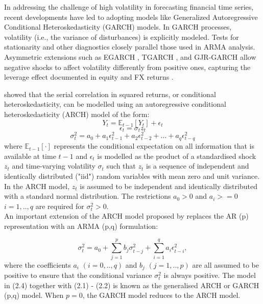 \documentclass[risks,article,submit,pdftex,moreauthors]{Definitions/mdpi}
\newcommand{\E}{\mathbb{E}}
\begin{document}
In addressing the challenge of high volatility in forecasting financial time series, recent developments have led to adopting models like Generalized Autoregressive Conditional Heteroskedasticity (GARCH) models. In GARCH processes, volatility (i.e., the variance of disturbances) is explicitly modeled. Tests for stationarity and other diagnostics closely parallel those used in ARMA analysis. Asymmetric extensions such as EGARCH \citep{nelson1991conditional}, TGARCH \citep{zakoian1994threshold}, and GJR-GARCH \citep{glosten1993relation} allow negative shocks to affect volatility differently from positive ones, capturing the leverage effect documented in equity and FX returns \citep{black1976studies, christie1982stochastic, cont2001empirical}.

\cite{engle1982autoregressive} showed that the serial correlation in squared returns, or conditional heteroskedasticity, can be modelled using an autoregressive conditional heteroskedasticity (ARCH) model of the form:
\begin{equation}
Y_t = \E_{t-1}[Y_t] + \epsilon_t
\end{equation}
\begin{equation}
\epsilon_t = \sigma_t z_t
\end{equation}
\begin{equation}
\sigma_t^2 = a_0 + a_1 \epsilon_{t-1}^2 + a_2 \epsilon_{t-2}^2 + \dots + a_q \epsilon_{t-q}^2  
\end{equation}
where \(\E_{t-1}[\cdot]\) represents the conditional expectation on all information that is available at time \(t-1\) and \(\epsilon_t\) is modelled as the product of a standardised shock \(z_t\) and time-varying volatility \(\sigma_t\) such that \(z_t\) is a sequence of independent and identically distributed ("iid") random variables with mean zero and unit variance. In the ARCH model, \(z_t\) is assumed to be independent and identically distributed with a standard normal distribution. The restrictions \(a_0 > 0\) and \(a_i >= 0\) \(i = 1,..,q\) are required for \(\sigma_t^2 > 0\).\\

An important extension of the ARCH model proposed by \cite{bollerslev1986generalised} replaces the AR (p) representation with an ARMA (p,q) formulation:

\begin{equation}
\sigma_t^2 = a_0 + \sum_{j=1}^p b_j \sigma_{t-j}^2 + \sum_{i=1}^q a_i \epsilon_{t-i}^2, 
\end{equation}
where the coefficients \(a_i\) \((i=0,..,q)\) and \(b_j\) \((j=1,..,p)\) are all assumed to be positive to ensure that the conditional variance \(\sigma_t^2\) is always positive. The model in (2.4) together with (2.1) - (2.2) is known as the generalised ARCH or GARCH (p,q) model. When \(p=0\), the GARCH model reduces to the ARCH model.
\end{document}
